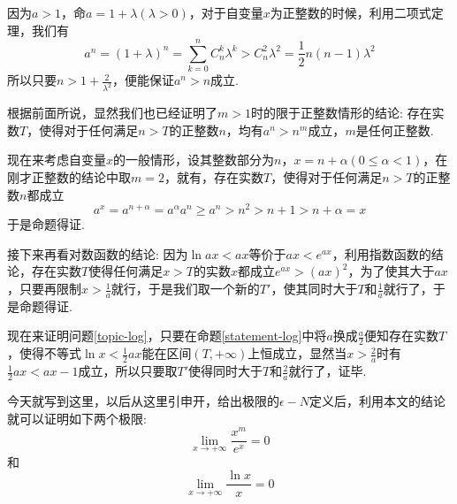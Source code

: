 因为$a>1$，命$a=1+\lambda(\lambda>0)$，对于自变量$x$为正整数的时候，利用二项式定理，我们有
\[ a^n = (1+\lambda)^n=\sum_{k=0}^nC_n^k\lambda^k > C_n^2\lambda^2 =\frac{1}{2}n(n-1)\lambda^2 \]
所以只要$n>1+\frac{2}{\lambda^2}$，便能保证$a^n>n$成立.

根据前面所说，显然我们也已经证明了$m>1$时的限于正整数情形的结论: 存在实数$T$，使得对于任何满足$n>T$的正整数$n$，均有$a^n>n^m$成立，$m$是任何正整数.

现在来考虑自变量$x$的一般情形，设其整数部分为$n$，$x=n+\alpha(0\leqslant \alpha < 1)$，在刚才正整数的结论中取$m=2$，就有，存在实数$T$，使得对于任何满足$n>T$的正整数$n$都成立
\[ a^x = a^{n+\alpha} = a^{\alpha}a^n \geqslant a^n > n^2 > n+1 > n+\alpha = x \]
于是命题得证.

接下来再看对数函数的结论:
因为$\ln{ax}<ax$等价于$ax<e^{ax}$，利用指数函数的结论，存在实数$T$使得任何满足$x>T$的实数$x$都成立$e^{ax}>(ax)^2$，为了使其大于$ax$，只要再限制$x>\frac{1}{a}$就行，于是我们取一个新的$T'$，使其同时大于$T$和$\frac{1}{a}$就行了，于是命题得证.

现在来证明问题\ref{topic-log}，只要在命题\ref{statement-log}中将$a$换成$\frac{a}{2}$便知存在实数$T$，使得不等式$\ln{x}<\frac{1}{2}ax$能在区间$(T,+\infty)$上恒成立，显然当$x>\frac{2}{a}$时有$\frac{1}{2}ax<ax-1$成立，所以只要取$T'$使得同时大于$T$和$\frac{2}{a}$就行了，证毕.

今天就写到这里，以后从这里引申开，给出极限的$\epsilon - N$定义后，利用本文的结论就可以证明如下两个极限:
\[ \lim_{x \to +\infty}\frac{x^m}{e^x} = 0 \] 
和
 \[ \lim_{x \to +\infty}\frac{\ln{x}}{x} = 0 \]
